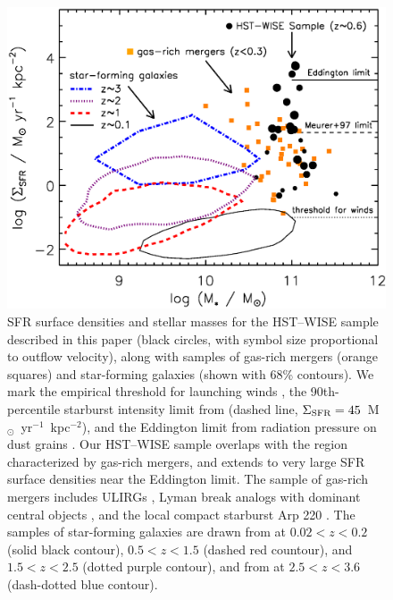 \documentclass[apj]{emulateapj}
\newcommand{\units}{M$_{\odot}$~yr$^{-1}$~kpc$^{-2}$}
\newcommand{\sigmasfr}{\Sigma_{\textnormal{\scriptsize{SFR}}}}
\begin{document}
\begin{figure}[!t]
\begin{center}
\includegraphics[angle=0,scale=.8]{sigmasfr.ps} %
\caption{SFR surface densities and stellar masses for the HST--WISE
  sample described in this paper (black circles, with symbol size
  proportional to outflow velocity), along with samples of gas-rich
  mergers (orange squares) and star-forming galaxies (shown with 68\%
  contours).  We mark the empirical threshold for launching winds
  \citep[dotted line, $\sigmasfr=0.1$~\units;][]{hec02}, the
  90th-percentile starburst intensity limit from \citet{meu97} (dashed
  line, $\sigmasfr=45$~\units), and the Eddington limit from radiation
  pressure on dust grains \citep[solid line,
    $\sigmasfr\approx2000$~\units;][]{mur05,tho05,hop10}.  Our
  HST--WISE sample overlaps with the region characterized by gas-rich
  mergers, and extends to very large SFR surface densities near the
  Eddington limit.  The sample of gas-rich mergers includes ULIRGs
  \citep{vei06}, Lyman break analogs with dominant central objects
  \citep{ove09}, and the local compact starburst Arp 220 \citep{sco97,
    ken98, rod08}.  The samples of star-forming galaxies are drawn
  from \citet{wuy11} at $0.02<z<0.2$ (solid black contour),
  $0.5<z<1.5$ (dashed red countour), and $1.5<z<2.5$ (dotted purple
  contour), and from \citet{law12} at $2.5<z<3.6$ (dash-dotted blue
  contour). }
\label{fig:sigmasfr}
\end{center}
\end{figure}
\end{document}
